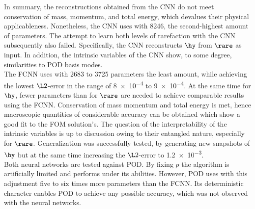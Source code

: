 In summary, the reconstructions obtained from the CNN do not meet conservation of mass, momentum, and total energy, which devalues their physical applicableness. Nonetheless, the CNN uses with 8246, the second-highest amount of parameters. The attempt to learn both levels of rarefaction with the CNN subsequently also failed. Specifically, the CNN reconstructs \(\hy\) from \(\rare\) as input. In addition, the intrinsic variables of the CNN show, to some degree, similarities to POD basis modes. \\
The FCNN uses with 2683 to 3725 parameters the least amount, while achieving the lowest \(\L2\)-error in the range of \num{8e-4} to \num{9e-4}. At the same time for \(\hy\), fewer parameters than for \(\rare\) are needed to achieve comparable results using the FCNN. Conservation of mass momentum and total energy is met, hence macroscopic quantities of considerable accuracy can be obtained which show a good fit to the FOM solution's. The question of the interpretability of the intrinsic variables is up to discussion owing to their entangled nature, especially for \(\rare\). Generalization was successfully tested, by generating new snapshots of \(\hy\) but at the same time increasing the \(\L2\)-error to \num{1.2e-3}.\\
Both neural networks are tested against POD. By fixing \(p\) the algorithm is artificially limited and performs under its abilities. However, POD uses with this adjustment five to six times more parameters than the FCNN. Its deterministic character enables POD to achieve any possible accuracy, which was not observed with the neural networks.    
